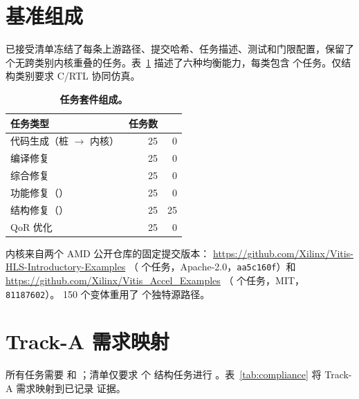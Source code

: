 \appendices

\section{基准组成}
\label{app:benchmark}

已接受清单冻结了每条上游路径、提交哈希、任务描述、测试和门限配置，保留了
\CorpusTaskCount{} 个无跨类别内核重叠的任务。表~\ref{tab:task-composition}
描述了六种均衡能力，每类包含 \TasksPerCategory{} 个任务。仅结构类别要求
C/RTL 协同仿真。

\begin{table}[H]
  \caption{\textbf{任务套件组成。}}
  \label{tab:task-composition}
  \centering
  \small
  \begin{tabular}{lrr}
    \toprule
    任务类型 & 任务数 & \CoSim{} \\
    \midrule
    代码生成（桩 $\to$ 内核） & 25 & 0 \\
    编译修复 & 25 & 0 \\
    综合修复 & 25 & 0 \\
    功能修复（\CSim{}） & 25 & 0 \\
    结构修复（\CoSim{}） & 25 & 25 \\
    QoR 优化 & 25 & 0 \\
    \bottomrule
  \end{tabular}
\end{table}

内核来自两个 AMD 公开仓库的固定提交版本：
\url{https://github.com/Xilinx/Vitis-HLS-Introductory-Examples}
（\IntroExampleTaskCount{} 个任务，Apache-2.0，\texttt{aa5c160f}）和
\url{https://github.com/Xilinx/Vitis_Accel_Examples}
（\AccelExampleTaskCount{} 个任务，MIT，\texttt{81187602}）。
150 个变体重用了 \UniqueSourcePathCount{} 个独特源路径。

\section{Track-A 需求映射}
\label{app:compliance}

所有任务需要 \CSim{} 和 \Synth{}；清单仅要求 \RequiredCosimTaskCount{} 个
结构任务进行 \CoSim{}。表~\ref{tab:compliance} 将 Track-A 需求映射到已记录
证据。

